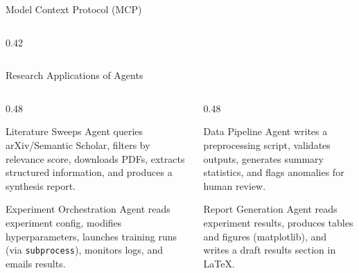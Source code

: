 \begin{frame}[shrink=18]{Model Context Protocol (MCP)}
\begin{columns}[T, onlytextwidth]
\begin{column}{0.42\textwidth}
    \end{column}
  \end{columns}
\end{frame}

\begin{frame}{Research Applications of Agents}
  \begin{columns}[T, onlytextwidth]
    \begin{column}{0.48\textwidth}
      \begin{block}{Literature Sweeps}
        Agent queries arXiv/Semantic Scholar, filters by relevance score, downloads PDFs, extracts structured information, and produces a synthesis report.
      \end{block}
      \vspace{0.4em}
      \begin{block}{Experiment Orchestration}
        Agent reads experiment config, modifies hyperparameters, launches training runs (via \texttt{subprocess}), monitors logs, and emails results.
      \end{block}
    \end{column}
    \hfill
    \begin{column}{0.48\textwidth}
      \begin{block}{Data Pipeline}
        Agent writes a preprocessing script, validates outputs, generates summary statistics, and flags anomalies for human review.
      \end{block}
      \vspace{0.4em}
      \begin{block}{Report Generation}
        Agent reads experiment results, produces tables and figures (matplotlib), and writes a draft results section in LaTeX.
      \end{block}
    \end{column}
  \end{columns}
\end{frame}

